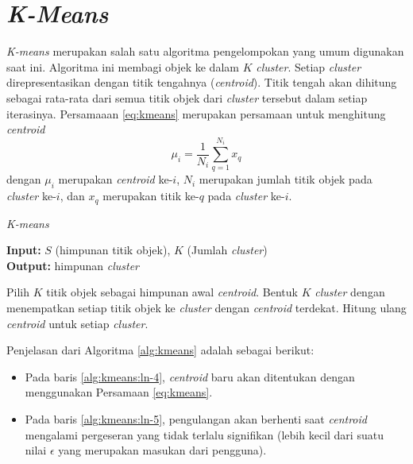 \section{\textit{K-Means}}
\textit{K-means} merupakan salah satu algoritma pengelompokan yang umum digunakan saat ini. Algoritma ini membagi objek ke dalam $K$ \textit{cluster}. Setiap \textit{cluster} direpresentasikan dengan titik tengahnya (\textit{centroid}). Titik tengah akan dihitung sebagai rata-rata dari semua titik objek dari \textit{cluster} tersebut dalam setiap iterasinya. Persamaaan \ref{eq:kmeans} merupakan persamaan untuk menghitung \textit{centroid}
\begin{equation}
	\label{eq:kmeans}
	\mu_i=\frac{1}{N_i}\sum_{q=1}^{N_i}x_q
\end{equation}
dengan $\mu_i$ merupakan \textit{centroid} ke-$i$, $N_i$ merupakan jumlah titik objek pada \textit{cluster} ke-$i$, dan $x_q$ merupakan titik ke-$q$ pada \textit{cluster} ke-$i$.

\begin{algorithm} %
\caption{\textit{K-means}} %
\label{alg:kmeans} %
\begin{flushleft}
	\textbf{Input:} $S$ (himpunan titik objek), $K$ (Jumlah \textit{cluster})\\
	\textbf{Output:} himpunan \textit{cluster}
\end{flushleft}
\begin{algorithmic}[1] %
	\STATE Pilih $K$ titik objek sebagai himpunan awal \textit{centroid}. \label{alg:kmeans:ln-1}
	\REPEAT \label{alg:kmeans:ln-2}
		\STATE Bentuk $K$ \textit{cluster} dengan menempatkan setiap titik objek ke \textit{cluster} dengan \textit{centroid} terdekat. \label{alg:kmeans:ln-3}
		\STATE Hitung ulang \textit{centroid} untuk setiap \textit{cluster}. \label{alg:kmeans:ln-4}
	 \label{alg:kmeans:ln-5}
\end{algorithmic}
\end{algorithm}

Penjelasan dari Algoritma \ref{alg:kmeans} adalah sebagai berikut:
\begin{itemize}
	\item Pada baris \ref{alg:kmeans:ln-4}, \textit{centroid} baru akan ditentukan dengan menggunakan Persamaan \ref{eq:kmeans}.
	\item Pada baris \ref{alg:kmeans:ln-5}, pengulangan akan berhenti saat \textit{centroid} mengalami pergeseran yang tidak terlalu signifikan (lebih kecil dari suatu nilai $\epsilon$ yang merupakan masukan dari pengguna).
\end{itemize}

